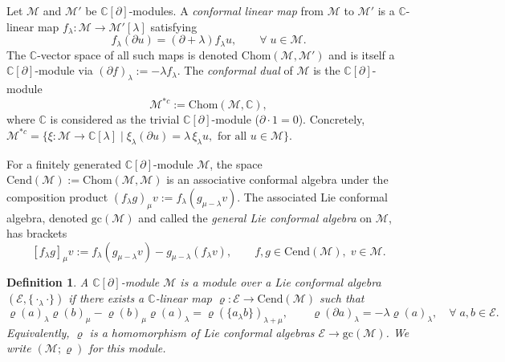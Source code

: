 \documentclass[a4paper,11pt]{article}
\def\Rg{\mathbb{C}[\partial]}
\def\Ep{\mathcal{E}}
\def\Mod{\mathcal{M}}
\def\rep{\varrho}
\def\C{\mathbb{C}}
\numberwithin{equation}{section}
\newtheorem{definition}[theorem]{Definition}
\begin{document}


Let $\Mod$ and $\Mod'$ be $\Rg$-modules. A \textit{conformal linear
map} from $\Mod$ to $\Mod'$ is a $\C$-linear map
$f_\lambda : \Mod \to \Mod'[\lambda]$ satisfying
\[
  f_\lambda(\partial u) = (\partial + \lambda)f_\lambda u,
  \qquad \forall\; u \in \Mod.
\]
The $\C$-vector space of all such maps is denoted $\mathrm{Chom}(\Mod,\Mod')$
and is itself a $\Rg$-module via $(\partial f)_\lambda := -\lambda f_\lambda$.
The \textit{conformal dual} of $\Mod$ is the $\Rg$-module
\[
  \Mod^{*c} := \mathrm{Chom}(\Mod,\C),
\]
where $\C$ is considered as the trivial $\Rg$-module ($\partial\cdot 1 = 0$).
Concretely,
$\Mod^{*c} = \{ \xi: \Mod\to\C[\lambda] \mid \xi_\lambda(\partial u)
= \lambda\,\xi_\lambda u, \text{ for all } u\in\Mod\}.$

For a finitely generated $\Rg$-module $\Mod$, the space
$\mathrm{Cend}(\Mod) := \mathrm{Chom}(\Mod,\Mod)$
is an associative conformal algebra under the composition product
$(f_\lambda g)_\mu v := f_\lambda(g_{\mu-\lambda}v)$.
The associated Lie conformal  algebra, denoted $\mathrm{gc}(\Mod)$
and called the \textit{general Lie conformal  algebra} on $\Mod$, has
brackets
\[
  [f_\lambda g]_\mu v
  := f_\lambda(g_{\mu-\lambda}v) - g_{\mu-\lambda}(f_\lambda v),
  \qquad f,g \in \mathrm{Cend}(\Mod),\; v\in\Mod.
\]


\begin{definition}\label{def:module}
A $\Rg$-module $\Mod$ is a \textit{module} over a Lie conformal  algebra
$(\Ep,\{\cdot_\lambda\cdot\})$ if there exists a $\C$-linear map
$\rep:\Ep\to\mathrm{Cend}(\Mod)$ such that
\begin{equation}\label{eq:module}
  \rep(a)_\lambda\rep(b)_\mu - \rep(b)_\mu\rep(a)_\lambda
  = \rep(\{a_\lambda b\})_{\lambda+\mu},
  \qquad
  \rep(\partial a)_\lambda = -\lambda\rep(a)_\lambda,
  \quad \forall\; a,b\in\Ep.
\end{equation}
Equivalently, $\rep$ is a homomorphism of Lie conformal  algebras
$\Ep\to\mathrm{gc}(\Mod)$. We write $(\Mod;\rep)$ for this module.
\end{definition}
\end{document}
